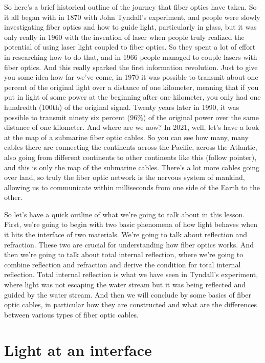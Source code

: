 So here's a brief historical outline of the journey that fiber optics have taken. So it all began with in 1870 with John Tyndall's experiment, and people were slowly investigating fiber optics and how to guide light, particularly in glass, but it was only really in 1960 with the invention of laser when people truly realized the potential of using laser light coupled to fiber optics. So they spent a lot of effort in researching how to do that, and in 1966 people managed to couple lasers with fiber optics. And this really sparked the first information revolution. Just to give you some idea how far we've come, in 1970 it was possible to transmit about one percent of the original light over a distance of one kilometer, meaning that if you put in light of some power at the beginning after one kilometer, you only had one hundredth (100th) of the original signal. Twenty years later in 1990, it was possible to transmit ninety six percent (96\%) of the original power over the same distance of one kilometer. And where are we now? In 2021, well, let's have a look at the map of a submarine fiber optic cables. So you can see how many, many cables there are connecting the continents across the Pacific, across the Atlantic, also going from different continents to other continents like this (follow pointer), and this is only the map of the submarine cables. There's a lot more cables going over land, so truly the fiber optic network is the nervous system of mankind, allowing us to communicate within milliseconds from one side of the Earth to the other.

So let's have a quick outline of what we're going to talk about in this lesson. First, we're going to begin with two basic phenomena of how light behaves when it hits the interface of two materials. We're going to talk about reflection and refraction. These two are crucial for understanding how fiber optics works. And then we're going to talk about total internal reflection, where we're going to combine reflection and refraction and derive the condition for total internal reflection. Total internal reflection is what we have seen in Tyndall's experiment, where light was not escaping the water stream but it was being reflected and guided by the water stream. And then we will conclude by some basics of fiber optic cables, in particular how they are constructed and what are the differences between various types of fiber optic cables.


\section{Light at an interface}

